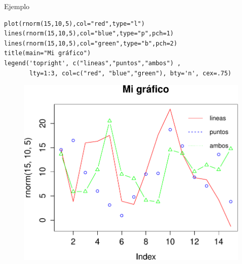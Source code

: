 \documentclass[handout]{beamer}
\begin{document}
\begin{frame}[fragile]{Ejemplo}
\scriptsize{
  \begin{verbatim}
plot(rnorm(15,10,5),col="red",type="l")
lines(rnorm(15,10,5),col="blue",type="p",pch=1)
lines(rnorm(15,10,5),col="green",type="b",pch=2)
title(main="Mi gráfico")
legend('topright', c("lineas","puntos","ambos") , 
       lty=1:3, col=c("red", "blue","green"), bty='n', cex=.75)  
 \end{verbatim}
 
 
  \begin{figure}[h!]
	\centering
	\includegraphics[scale=0.38]{imagenes/rplot.pdf}
	
	
\end{figure} 



 
} 
\end{frame}
\end{document}
